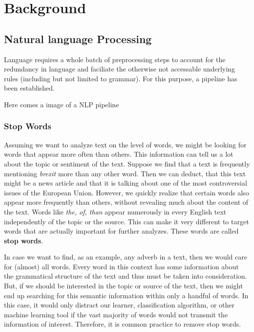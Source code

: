 \chapter{Background}


\section{Natural language Processing}
Language requires a whole batch of preprocessing steps to account for the redundancy in language and faciliate the otherwise not accessable underlying rules (including but not limited to grammar). For this purpose, a pipeline has been established.

Here comes a image of a NLP pipeline

\subsection{Stop Words}
Assuming we want to analyze text on the level of words, we might be looking for
words that appear more often than others. This information can tell us a lot about
the topic or sentiment of the text. Suppose we find that a text is frequently
mentioning \textit{brexit} more than any other word. Then we can deduct, that this text might
be a news article and that it is talking about one of the most controversial issues
of the European Union. However, we quickly realize that certain words
also appear more frequently than others, without revealing much about the content
of the text. Words like \textit{the, of, than} appear numerously in every English
text independently of the topic or the source. This can make it very different to target
words that are actually important for further analyzes. These words are called \textbf{stop words}.

In case we want to find, as an example, any adverb in a text, then we would care for (almost) all words.
Every word in this context has some information about the grammatical structure of the text
and thus must be taken into consideration. But, if we should be interested in the topic
or source of the text, then we might end up searching for this semantic information within only a handful of words.
In this case, it would only distract our learner, classification algorithm, or other machine
learning tool if the vast majority of words would not transmit the information
of interest. Therefore, it is common practice to remove stop words.

